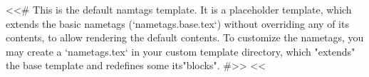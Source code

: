 <<# This is the default namtags template. It is a placeholder template, which extends the basic nametags
    (`nametags.base.tex`) without overriding any of its contents, to allow rendering the default contents.
    To customize the nametags, you may create a `nametags.tex` in your custom template directory, which "extends" the
    base template and redefines some its"blocks".
#>>
<<%
